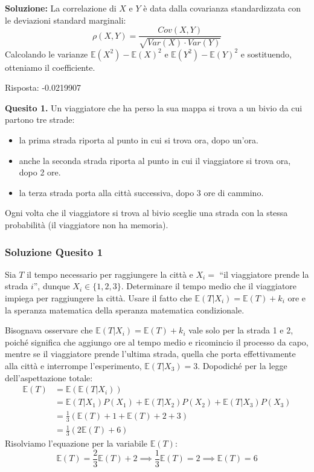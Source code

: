 \documentclass[12pt, a4paper]{article}
\begin{document}
\textbf{Soluzione:}
La correlazione di $X$ e $Y$ è data dalla covarianza standardizzata con le deviazioni standard marginali:
$$ \rho(X,Y) = \frac{Cov(X,Y)}{\sqrt{Var(X) \cdot Var(Y)}} $$
Calcolando le varianze $\mathbb{E}(X^2) - \mathbb{E}(X)^2$ e $\mathbb{E}(Y^2) - \mathbb{E}(Y)^2$ e sostituendo, otteniamo il coefficiente.

Risposta: -0.0219907


\vspace{0.5cm}
\begin{tcolorbox}[colback=lightergray!10, colframe=tocsec, title=\textbf{Esercizio 9}]
\textbf{Quesito 1.} Un viaggiatore che ha perso la sua mappa si trova a un bivio da cui partono tre strade:
\begin{itemize}
    \item la prima strada riporta al punto in cui si trova ora, dopo un’ora.
    \item anche la seconda strada riporta al punto in cui il viaggiatore si trova ora, dopo 2 ore.
    \item la terza strada porta alla città successiva, dopo 3 ore di cammino.
\end{itemize}
Ogni volta che il viaggiatore si trova al bivio sceglie una strada con la stessa probabilità (il viaggiatore non ha memoria).
\end{tcolorbox}

\subsubsection*{Soluzione Quesito 1}
Sia $T$ il tempo necessario per raggiungere la città e $X_i =$ ``il viaggiatore prende la strada $i$'', dunque $X_i \in \{1,2,3\}$.
Determinare il tempo medio che il viaggiatore impiega per raggiungere la città.
Usare il fatto che $\mathbb{E}(T|X_i) = \mathbb{E}(T) + k_i$ ore e la speranza matematica della speranza matematica condizionale.

Bisognava osservare che $\mathbb{E}(T|X_i) = \mathbb{E}(T) + k_i$ vale solo per la strada 1 e 2, poiché significa che aggiungo ore al tempo medio e ricomincio il processo da capo, mentre se il viaggiatore prende l’ultima strada, quella che porta effettivamente alla città e interrompe l'esperimento, $\mathbb{E}(T|X_3) = 3$.
Dopodiché per la legge dell'aspettazione totale:
$$ \begin{aligned} \mathbb{E}(T) &= \mathbb{E}(\mathbb{E}(T|X_i)) \\ &= \mathbb{E}(T|X_1)P(X_1) + \mathbb{E}(T|X_2)P(X_2) + \mathbb{E}(T|X_3)P(X_3) \\ &= \frac{1}{3} (\mathbb{E}(T) + 1 + \mathbb{E}(T) + 2 + 3) \\ &= \frac{1}{3} (2\mathbb{E}(T) + 6) \end{aligned} $$
Risolviamo l'equazione per la variabile $\mathbb{E}(T)$:
$$ \mathbb{E}(T) = \frac{2}{3}\mathbb{E}(T) + 2 \implies \frac{1}{3}\mathbb{E}(T) = 2 \implies \mathbb{E}(T) = 6 $$
\end{document}
